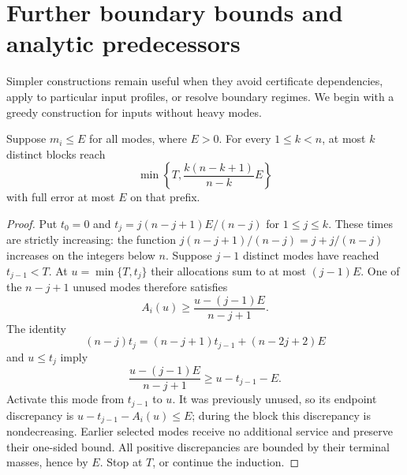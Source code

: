 \section{Further boundary bounds and analytic predecessors}
\label{sec:predecessors}

Simpler constructions remain useful when they avoid certificate
dependencies, apply to particular input profiles, or resolve boundary
regimes. We begin with a greedy construction for inputs without heavy
modes.

\begin{lemma}\label{lem:all-light}
Suppose $m_i\le E$ for all modes, where $E>0$. For every $1\le k<n$,
at most $k$ distinct blocks reach
\begin{equation}\label{eq:all-light-reach}
 \min\left\{T,\frac{k(n-k+1)}{n-k}E\right\}
\end{equation}
with full error at most $E$ on that prefix.
\end{lemma}
\begin{proof}
Put $t_0=0$ and $t_j=j(n-j+1)E/(n-j)$ for $1\le j\le k$.
These times are strictly increasing: the function
$j(n-j+1)/(n-j)=j+j/(n-j)$ increases on the integers below $n$.
Suppose $j-1$ distinct modes have reached $t_{j-1}<T$. At
$u=\min\{T,t_j\}$ their allocations sum to at most $(j-1)E$.
One of the $n-j+1$ unused modes therefore satisfies
\[
 A_i(u)\ge\frac{u-(j-1)E}{n-j+1}.
\]
The identity
\[
 (n-j)t_j=(n-j+1)t_{j-1}+(n-2j+2)E
\]
and $u\le t_j$ imply
\[
 \frac{u-(j-1)E}{n-j+1}\ge u-t_{j-1}-E.
\]
Activate this mode from $t_{j-1}$ to $u$. It was previously unused,
so its endpoint discrepancy is $u-t_{j-1}-A_i(u)\le E$; during the
block this discrepancy is nondecreasing. Earlier selected modes receive
no additional service and preserve their one-sided bound. All positive
discrepancies are bounded by their terminal masses, hence by $E$.
Stop at $T$, or continue the induction.
\end{proof}

